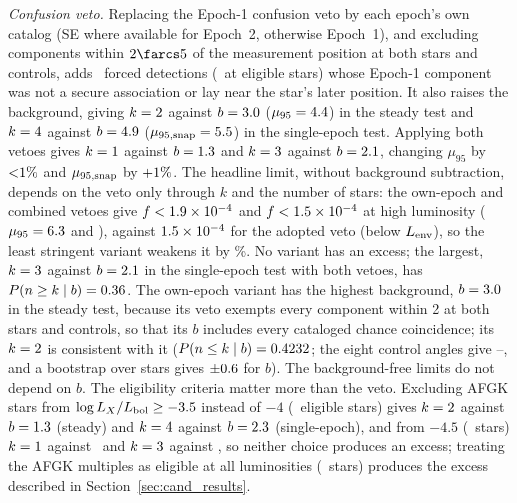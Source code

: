 \documentclass[linenumbers]{aastex702}
\begin{document}
\emph{Confusion veto.} Replacing the Epoch-1 confusion veto by each epoch's own catalog (SE where available for Epoch~2, otherwise Epoch~1), and excluding components within $2\farcs5$ of the measurement position at both stars and controls, adds \XcOwnAdded\ forced detections (\XcOwnAddedUnexpl\ at eligible stars) whose Epoch-1 component was not a secure association or lay near the star's later position. It also raises the background, giving $k=2$ against $b=3.0$ ($\mu_{95}=4.4$) in the steady test and $k=4$ against $b=4.9$ ($\mu_{95,{\rm snap}}=5.5$) in the single-epoch test. Applying both vetoes gives $k=1$ against $b=1.3$ and $k=3$ against $b=2.1$, changing $\mu_{95}$ by ${<}1\%$ and $\mu_{95,{\rm snap}}$ by $+1\%$. The headline limit, without background subtraction, depends on the veto only through $k$ and the number of stars: the own-epoch and combined vetoes give $f<1.9\times10^{-4}$ and $f<1.5\times10^{-4}$ at high luminosity ($\mu_{95}=6.3$ and \XcUnionMuBz), against $1.5\times10^{-4}$ for the adopted veto (below $L_{\rm env}$), so the least stringent variant weakens it by \XcOwnFBzPct\%. No variant has an excess; the largest, $k=3$ against $b=2.1$ in the single-epoch test with both vetoes, has $P(n\ge k\mid b)=0.36$. The own-epoch variant has the highest background, $b=3.0$ in the steady test, because its veto exempts every component within 2 at both stars and controls, so that its $b$ includes every cataloged chance coincidence; its $k=2$ is consistent with it ($P(n\le k\mid b)=0.4232$; the eight control angles give \XcOwnAngleMin--\XcOwnAngleMax, and a bootstrap over stars gives $\pm0.6$ for $b$). The background-free limits do not depend on $b$. The eligibility criteria matter more than the veto. Excluding AFGK stars from $\log L_X/L_{\rm bol}\ge-3.5$ instead of $-4$ (\NEligLxA\ eligible stars) gives $k=2$ against $b=1.3$ (steady) and $k=4$ against $b=2.3$ (single-epoch), and from $-4.5$ (\NEligLxB\ stars) $k=1$ against \BSteadyLxB\ and $k=3$ against \BSnapLxB, so neither choice produces an excess; treating the AFGK multiples as eligible at all luminosities (\NEligWithMult\ stars) produces the excess described in Section~\ref{sec:cand_results}.
\end{document}
